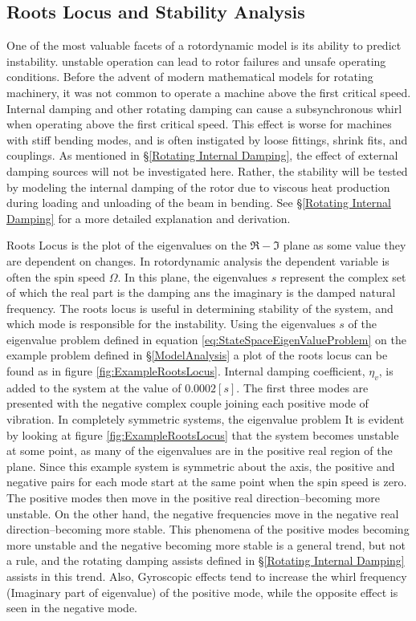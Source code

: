 \subsection{Roots Locus and Stability Analysis}
One of the most valuable facets of a rotordynamic model is its ability to predict instability. unstable operation can lead to rotor failures and unsafe operating conditions. Before the advent of modern mathematical models for rotating machinery, it was not common to operate a machine above the first critical speed. Internal damping and other rotating damping can cause a subsynchronous whirl when operating above the first critical speed. This effect is worse for machines with stiff bending modes, and is often instigated by loose fittings, shrink fits, and couplings. As mentioned in \S\ref{Rotating Internal Damping}, the effect of external damping sources will not be investigated here. Rather, the stability will be tested by modeling the internal damping of the rotor due to viscous heat production during loading and unloading of the beam in bending. See \S\ref{Rotating Internal Damping} for a more detailed explanation and derivation.\par 
Roots Locus is the plot of the eigenvalues on the $ \Re-\Im $ plane as some value they are dependent on changes. In rotordynamic analysis the dependent variable is often the spin speed $ \Omega $. In this plane, the eigenvalues $ s $ represent the complex set of which the real part is the damping ans the imaginary is the damped natural frequency. The roots locus is useful in determining stability of the system, and which mode is responsible for the instability. Using the eigenvalues $ s $ of the eigenvalue problem defined in equation \eqref{eq:StateSpaceEigenValueProblem} on the example problem defined in \S\ref{ModelAnalysis} a plot of the roots locus can be found as in figure \ref{fig:ExampleRootsLocus}. Internal damping coefficient, $ \eta_v $, is added to the system at the value of $ 0.0002[s] $. The first three modes are presented with the negative complex couple joining each positive mode of vibration. In completely symmetric systems, the eigenvalue problem  It is evident by looking at figure \ref{fig:ExampleRootsLocus} that the system becomes unstable at some point, as many of the eigenvalues are in the positive real region of the plane. Since this example system is symmetric about the axis, the positive and negative pairs for each mode start at the same point when the spin speed is zero. The positive modes then move in the positive real direction--becoming more unstable. On the other hand, the negative frequencies move in the negative real direction--becoming more stable. This phenomena of the positive modes becoming more unstable and the negative becoming more stable is a general trend, but not a rule, and the rotating damping assists defined in \S\ref{Rotating Internal Damping} assists in this trend. Also, Gyroscopic effects tend to increase the whirl frequency (Imaginary part of eigenvalue) of the positive mode, while the opposite effect is seen in the negative mode.\par 
